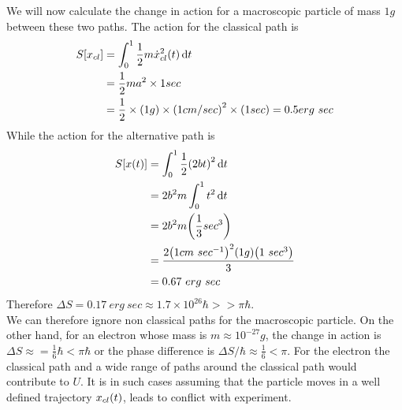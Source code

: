 	We will now calculate the change in action for a macroscopic particle of mass $1 g$ between these two paths. The action for the classical path is
	\begin{align*}
		S\qty[x_{cl}] 
		&= \int_{0}^{1} \frac{1}{2} m \dot{x}_{cl}^2\qty(t) \dd{t} \\
		&= \frac{1}{2} m a^2 \times 1 sec \\
		&= \frac{1}{2} \times \qty(1 g) \times \qty(1 cm/sec)^2 \times (1 sec) = 0.5 erg\ sec
	\end{align*}
	While the action for the alternative path is 
	\begin{align*}
		S\qty[x\qty(t)] 
		&=\int_{0}^{1}\frac{1}{2} \qty(2 b t)^2 \dd{t} \\
		&= 2 b^2 m \int_{0}^{1} t^2 \dd{t}\\
		&= 2 b^2 m \qty(\frac{1}{3} sec^3) \\
		&= \frac{2 \qty(1 cm\ {sec}^{-1})^2 \qty(1 g)\qty(1\ sec^3)}{3} \\
		&= 0.67\ erg \ sec
	\end{align*}
	Therefore $\Delta S = 0.17 \ erg\ sec \approx 1.7 \times 10^{26} \hbar >> \pi \hbar$.\\
	We can therefore ignore non classical paths for the macroscopic particle. On the other hand, for an electron whose mass is $m \approx 10^{-27} g$, the change in action is $\Delta S \approx = \frac{1}{6} \hbar < \pi \hbar$ or the phase difference is $\Delta S/\hbar \approx \frac{1}{6} < \pi$. For the electron the classical path and a wide range of paths around the classical path would contribute to $U$. It is in such cases assuming that the particle moves in a well defined trajectory $x_{cl}\qty(t)$, leads to conflict with experiment.
	
		
		


